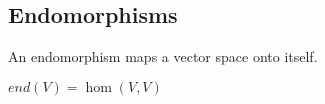 
\subsection{Endomorphisms}

An endomorphism maps a vector space onto itself.

\( end (V)=\hom (V, V)\)

